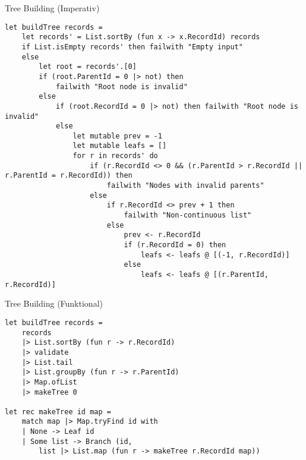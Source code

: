 \documentclass[t]{beamer}
\begin{document}
\begin{frame}[label={sec:orgd78e686},fragile]{Tree Building (Imperativ)}
 \begin{verbatim}
let buildTree records =
    let records' = List.sortBy (fun x -> x.RecordId) records
    if List.isEmpty records' then failwith "Empty input"
    else
        let root = records'.[0]
        if (root.ParentId = 0 |> not) then
            failwith "Root node is invalid"
        else
            if (root.RecordId = 0 |> not) then failwith "Root node is invalid"
            else
                let mutable prev = -1
                let mutable leafs = []
                for r in records' do
                    if (r.RecordId <> 0 && (r.ParentId > r.RecordId || r.ParentId = r.RecordId)) then
                        failwith "Nodes with invalid parents"
                    else
                        if r.RecordId <> prev + 1 then
                            failwith "Non-continuous list"
                        else
                            prev <- r.RecordId
                            if (r.RecordId = 0) then
                                leafs <- leafs @ [(-1, r.RecordId)]
                            else
                                leafs <- leafs @ [(r.ParentId, r.RecordId)]
\end{verbatim}
\end{frame}

\begin{frame}[label={sec:orga0b4e86},fragile]{Tree Building (Funktional)}
 \begin{verbatim}
let buildTree records = 
    records
    |> List.sortBy (fun r -> r.RecordId)
    |> validate
    |> List.tail
    |> List.groupBy (fun r -> r.ParentId)
    |> Map.ofList
    |> makeTree 0

let rec makeTree id map =
    match map |> Map.tryFind id with
    | None -> Leaf id
    | Some list -> Branch (id, 
        list |> List.map (fun r -> makeTree r.RecordId map))
\end{verbatim}
\end{frame}
\end{document}

